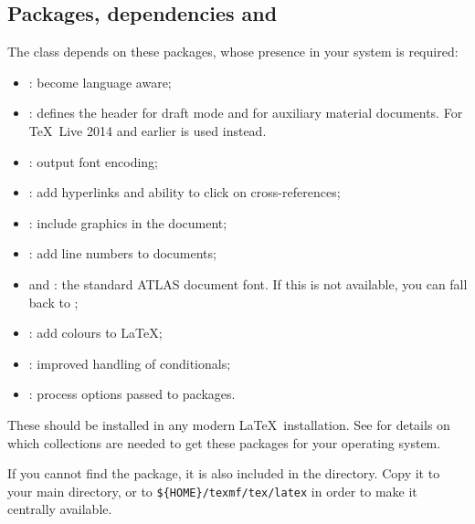 \subsection{Packages, dependencies and }
\label{sec:atlaspackage}

The  class depends on these packages, whose presence in
your system is required:
\begin{itemize}\setlength{\parskip}{0pt}\setlength{\itemsep}{0pt}
\item {}: become language aware;
\item {}: defines the header for draft mode
  and for auxiliary material documents.
  For \TeX\ Live 2014 and earlier  is used instead.
\item {}: output font encoding;
\item {}: add hyperlinks and ability to click on cross-references;
\item {}: include graphics in the document;
\item {}: add line numbers to documents;
\item {} and : the standard ATLAS document font.
  If this is not available, you can fall back to ;
\item {}: add colours to \LaTeX;
\item {}: improved handling of conditionals;
\item {}: process options passed to packages.
\end{itemize}
These should be installed in any modern \LaTeX\ installation.
See \cite{latex-faq} for details on which collections are needed to get these packages
for your operating system.

If you cannot find the  package, it is also included in the  directory.
Copy it to your main directory, or to \verb|${HOME}/texmf/tex/latex| in order to make
it centrally available.

